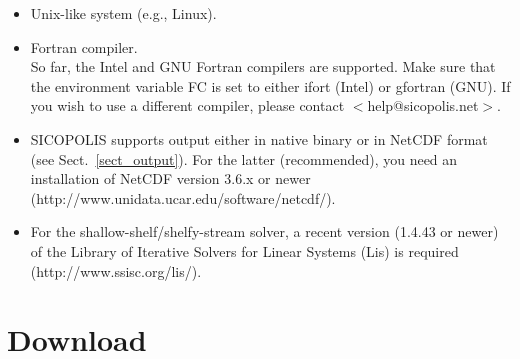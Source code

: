 \documentclass[12pt,a4paper]{article}
\begin{document}
\begin{itemize}

\item Unix-like system (e.g., Linux).

\item Fortran compiler.
\\
So far, the Intel and GNU Fortran compilers are supported. Make sure that the environment variable FC is set to either ifort (Intel) or gfortran (GNU). If you wish to use a different compiler, please contact $<$help@sicopolis.net$>$.

\item SICOPOLIS supports output either in native binary or in NetCDF format (see Sect.~\ref{sect_output}). For the latter (recommended), you need an installation of NetCDF version 3.6.x or newer (http://www.unidata.ucar.edu/software/netcdf/).

\item For the shallow-shelf/shelfy-stream solver, a recent version (1.4.43 or newer) of the Library of Iterative Solvers for Linear Systems (Lis) is required
\\
(http://www.ssisc.org/lis/).

\end{itemize}

\section{Download}
\end{document}
